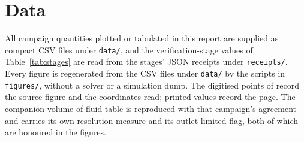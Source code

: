 \documentclass[11pt,a4paper]{article}
\begin{document}
\section*{Data}

All campaign quantities plotted or tabulated in this report are supplied as
compact CSV files under \nolinkurl{data/}, and the verification-stage values of
Table~\ref{tab:stages} are read from the stages' JSON receipts under
\nolinkurl{receipts/}. Every figure is regenerated from the CSV files under
\nolinkurl{data/} by the scripts in \nolinkurl{figures/}, without a solver or
a simulation dump. The
digitised points of \citet{giavedoni1997axisymmetric} record the source figure
and the coordinates read; printed values record the page. The companion volume-of-fluid table is reproduced
with that campaign's agreement and carries its own resolution measure and its
outlet-limited flag, both of which are honoured in the figures.



\end{document}

